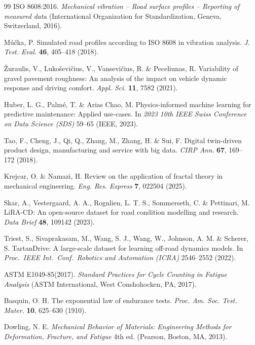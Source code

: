 \documentclass[11pt]{article}
\begin{document}
\begin{thebibliography}{99}
ISO 8608:2016. \textit{Mechanical vibration -- Road surface profiles -- Reporting of measured data} (International Organization for Standardization, Geneva, Switzerland, 2016).

M\'{u}\v{c}ka, P. Simulated road profiles according to ISO 8608 in vibration analysis. \textit{J. Test. Eval.} \textbf{46}, 405--418 (2018).

\v{Z}uraulis, V., Luko\v{s}evi\v{c}ius, V., Vansevi\v{c}ius, R. \& Peceliunas, R. Variability of gravel pavement roughness: An analysis of the impact on vehicle dynamic response and driving comfort. \textit{Appl. Sci.} \textbf{11}, 7582 (2021).

Huber, L. G., Palm\'{e}, T. \& Arias Chao, M. Physics-informed machine learning for predictive maintenance: Applied use-cases. In \textit{2023 10th IEEE Swiss Conference on Data Science (SDS)} 59--65 (IEEE, 2023).

Tao, F., Cheng, J., Qi, Q., Zhang, M., Zhang, H. \& Sui, F. Digital twin-driven product design, manufacturing and service with big data. \textit{CIRP Ann.} \textbf{67}, 169--172 (2018).

Krejcar, O. \& Namazi, H. Review on the application of fractal theory in mechanical engineering. \textit{Eng. Res. Express} \textbf{7}, 022504 (2025).

Skar, A., Vestergaard, A. A., Rognlien, L. T. S., Sommerseth, C. \& Pettinari, M. LiRA-CD: An open-source dataset for road condition modelling and research. \textit{Data Brief} \textbf{48}, 109142 (2023).

Triest, S., Sivaprakasam, M., Wang, S. J., Wang, W., Johnson, A. M. \& Scherer, S. TartanDrive: A large-scale dataset for learning off-road dynamics models. In \textit{Proc.\ IEEE Int.\ Conf.\ Robotics and Automation (ICRA)} 2546--2552 (2022).

ASTM E1049-85(2017). \textit{Standard Practices for Cycle Counting in Fatigue Analysis} (ASTM International, West Conshohocken, PA, 2017).

Basquin, O. H. The exponential law of endurance tests. \textit{Proc. Am. Soc. Test. Mater.} \textbf{10}, 625--630 (1910).

Dowling, N. E. \textit{Mechanical Behavior of Materials: Engineering Methods for Deformation, Fracture, and Fatigue} 4th ed. (Pearson, Boston, MA, 2013).


\end{thebibliography}
\end{document}

